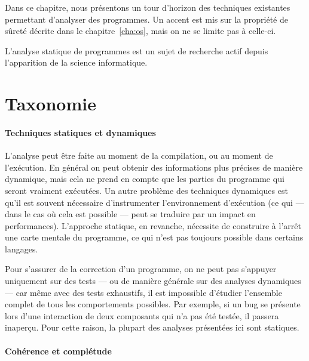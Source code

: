 

Dans ce chapitre, nous présentons un tour d'horizon des techniques existantes
permettant d'analyser des programmes. Un accent est mis sur la propriété de
sûreté décrite dans le chapitre~\ref{cha:os}, mais on ne se limite pas à
celle-ci.

L'analyse statique de programmes est un sujet de recherche actif depuis
l'apparition de la science informatique.

\section{Taxonomie}

\paragraph{Techniques statiques et dynamiques}

L'analyse peut être faite au moment de la compilation, ou au moment de
l'exécution. En général on peut obtenir des informations plus précises de
manière dynamique, mais cela ne prend en compte que les parties du programme qui
seront vraiment exécutées. Un autre problème des techniques dynamiques est qu'il
est souvent nécessaire d'instrumenter l'environnement d'exécution (ce qui ---
dans le cas où cela est possible --- peut se traduire par un impact en
performances). L'approche statique, en revanche, nécessite de construire à
l'arrêt une carte mentale du programme, ce qui n'est pas toujours possible dans
certains langages.

Pour s'assurer de la correction d'un programme, on ne peut pas s'appuyer
uniquement sur des tests --- ou de manière générale sur des analyses dynamiques
--- car même avec des tests exhaustifs, il est impossible d'étudier l'ensemble
complet de tous les comportements possibles. Par exemple, si un bug se présente
lors d'une interaction de deux composants qui n'a pas été testée, il passera
inaperçu. Pour cette raison, la plupart des analyses présentées ici sont
statiques.

\paragraph{Cohérence et complétude}

